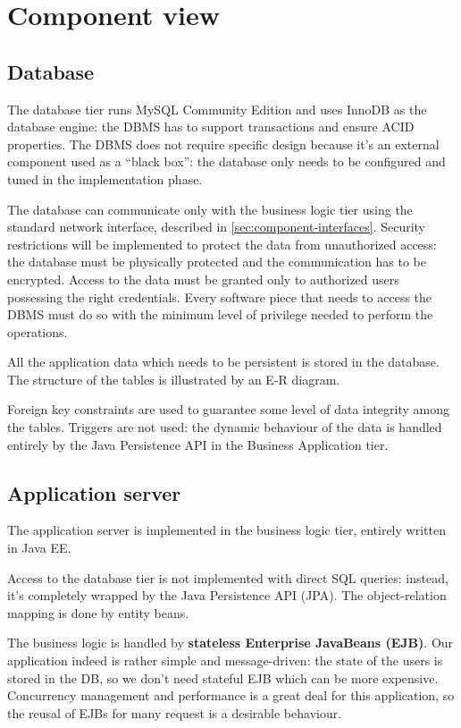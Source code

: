 \section{Component view}
\label{sec:component-view}

\subsection{Database}
The database tier runs MySQL Community Edition and uses InnoDB as the database engine: the DBMS has to support transactions and ensure ACID properties.
The DBMS does not require specific design because it's an external component used as a ``black box'': the database only needs to be configured and tuned in the implementation phase.

The database can communicate only with the business logic tier using the standard network interface, described in \autoref{sec:component-interfaces}.
Security restrictions will be implemented to protect the data from unauthorized access: the database must be physically protected and the communication has to be encrypted. Access to the data must be granted only to authorized users possessing the right credentials. Every software piece that needs to access the DBMS must do so with the minimum level of privilege needed to perform the operations.

All the application data which needs to be persistent is stored in the database. The structure of the tables is illustrated by an E-R diagram. %

Foreign key constraints are used to guarantee some level of data integrity among the tables.
Triggers are not used: the dynamic behaviour of the data is handled entirely by the Java Persistence API in the Business Application tier.

\subsection{Application server}
The application server is implemented in the business logic tier, entirely written in Java EE.

Access to the database tier is not implemented with direct SQL queries: instead, it's completely wrapped by the Java Persistence API (JPA). The object-relation mapping is done by entity beans.

The business logic is handled by \textbf{stateless Enterprise JavaBeans (EJB)}.
Our application indeed is rather simple and message-driven: the state of the users is stored in the DB, so we don't need stateful EJB which can be more expensive.
Concurrency management and performance is a great deal for this application, so the reusal of EJBs for many request is a desirable behaviour.

